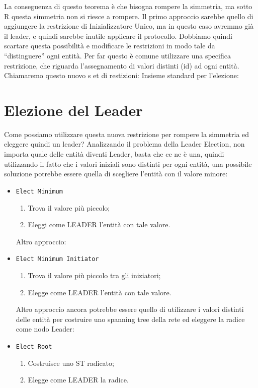 La conseguenza di questo teorema è che bisogna rompere la simmetria, ma sotto R questa simmetria non si riesce a rompere. Il primo approccio sarebbe quello di aggiungere la restrizione di Inizializzatore Unico, ma in questo caso avremmo già il leader, e quindi sarebbe inutile applicare il protocollo. Dobbiamo quindi scartare questa possibilità e modificare le restrizioni in modo tale da ``distinguere'' ogni entità. Per far questo è comune utilizzare una specifica restrizione, che riguarda l'assegnamento di valori distinti (id) ad ogni entità. Chiamaremo questo nuovo s et di restizioni: Insieme standard per l'elezione:


\section{Elezione del Leader}
Come possiamo utilizzare questa nuova restrizione per rompere la simmetria ed eleggere quindi un leader?
Analizzando il problema della Leader Election, non importa quale delle entità diventi Leader, basta che ce ne è una, quindi utilizzando il fatto che i valori iniziali sono distinti per ogni entità, una possibile soluzione potrebbe essere quella di scegliere l'entità con il valore minore:
\begin{itemize}
 \item \texttt{Elect Minimum}
 \begin{enumerate}
    \item Trova il valore più piccolo;
    \item Eleggi come LEADER l'entità con tale valore.
  \end{enumerate}
Altro approccio:
  \item \texttt{Elect Minimum Initiator}
 \begin{enumerate}
    \item Trova il valore più piccolo tra gli iniziatori;
    \item Elegge come LEADER l'entità con tale valore.
  \end{enumerate}
Altro approccio ancora potrebbe essere quello di utilizzare i valori distinti delle entità per costruire uno spanning tree della rete ed eleggere la radice come nodo Leader:
  \item \texttt{Elect Root}
  \begin{enumerate}
    \item Costruisce uno ST radicato;
    \item Elegge come LEADER la radice.
  \end{enumerate}
\end{itemize}

